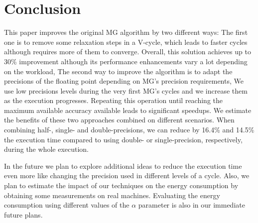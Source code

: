 \section{Conclusion}
\label{sec:conclusions}

This paper improves the original MG algorithm by two different ways: The first
one is to remove some relaxation steps in a V-cycle, which leads to faster
cycles although requires more of them to converge.  Overall, this solution
achieves up to 30\% improvement although its performance enhancements vary a
lot depending on the workload, The second way to improve the algorithm is to
adapt the precisions of the floating point depending on MG's precision
requirements, We use low precisions levels during the very first MG's cycles
and we increase them as the execution progresses.  Repeating this operation
until reaching the maximum available accuracy available leads to significant
speedups.  We estimate the benefits of these two approaches combined on
different scenarios.  When combining half-, single- and double-precisions, we
can reduce by 16.4\% and 14.5\% the execution time compared to using double- or
single-precision, respectively, during the whole execution.

In the future we plan to explore additional ideas to reduce the execution time
even more like changing the precision used in different levels of a cycle.
Also, we plan to estimate the impact of our techniques on the energy
consumption by obtaining some measurements on real machines.  Evaluating the
energy consumption using different values of the $\alpha$ parameter is also in
our immediate future plans.



